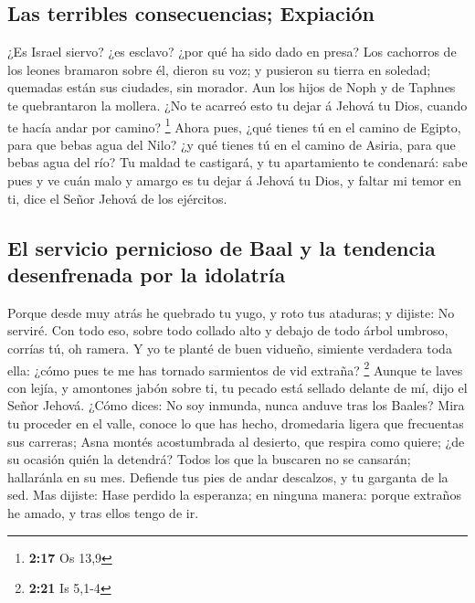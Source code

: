 \hypertarget{las-terribles-consecuencias-expiaciuxf3n}{%
\subsection{Las terribles consecuencias;
Expiación}\label{las-terribles-consecuencias-expiaciuxf3n}}

 ¿Es Israel siervo? ¿es esclavo? ¿por qué ha sido dado en
presa?  Los cachorros de los leones bramaron sobre él,
dieron su voz; y pusieron su tierra en soledad; quemadas están sus
ciudades, sin morador.  Aun los hijos de Noph y de
Taphnes te quebrantaron la mollera.  ¿No te acarreó esto
tu dejar á Jehová tu Dios, cuando te hacía andar por camino? \footnote{\textbf{2:17}
  Os 13,9}  Ahora pues, ¿qué tienes tú en el camino de
Egipto, para que bebas agua del Nilo? ¿y qué tienes tú en el camino de
Asiria, para que bebas agua del río?  Tu maldad te
castigará, y tu apartamiento te condenará: sabe pues y ve cuán malo y
amargo es tu dejar á Jehová tu Dios, y faltar mi temor en ti, dice el
Señor Jehová de los ejércitos.

\hypertarget{el-servicio-pernicioso-de-baal-y-la-tendencia-desenfrenada-por-la-idolatruxeda}{%
\subsection{El servicio pernicioso de Baal y la tendencia desenfrenada
por la
idolatría}\label{el-servicio-pernicioso-de-baal-y-la-tendencia-desenfrenada-por-la-idolatruxeda}}

 Porque desde muy atrás he quebrado tu yugo, y roto tus
ataduras; y dijiste: No serviré. Con todo eso, sobre todo collado alto y
debajo de todo árbol umbroso, corrías tú, oh ramera.  Y
yo te planté de buen vidueño, simiente verdadera toda ella: ¿cómo pues
te me has tornado sarmientos de vid extraña? \footnote{\textbf{2:21} Is
  5,1-4}  Aunque te laves con lejía, y amontones jabón
sobre ti, tu pecado está sellado delante de mí, dijo el Señor Jehová.
 ¿Cómo dices: No soy inmunda, nunca anduve tras los
Baales? Mira tu proceder en el valle, conoce lo que has hecho,
dromedaria ligera que frecuentas sus carreras;  Asna
montés acostumbrada al desierto, que respira como quiere; ¿de su ocasión
quién la detendrá? Todos los que la buscaren no se cansarán; hallaránla
en su mes.  Defiende tus pies de andar descalzos, y tu
garganta de la sed. Mas dijiste: Hase perdido la esperanza; en ninguna
manera: porque extraños he amado, y tras ellos tengo de ir.

